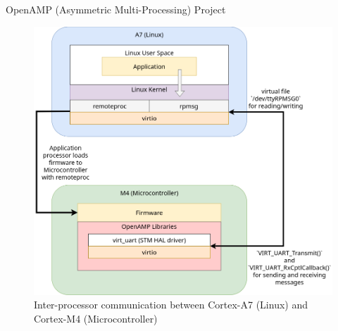 \documentclass[8pt,compress]{beamer}
\begin{document}
\begin{frame}
\begin{minipage}{0.465\textwidth}
\begin{block}{OpenAMP (Asymmetric Multi-Processing) Project}
    \end{block}
  \end{minipage}
  \hfill
  \begin{minipage}{0.465\textwidth}
    \begin{figure}
      \includegraphics[width=\textwidth]{assets/diagrams/ipc.drawio.png}
      \caption{Inter-processor communication between Cortex-A7 (Linux) and Cortex-M4 (Microcontroller)}
    \end{figure}
  \end{minipage}
\end{frame}

\end{document}
